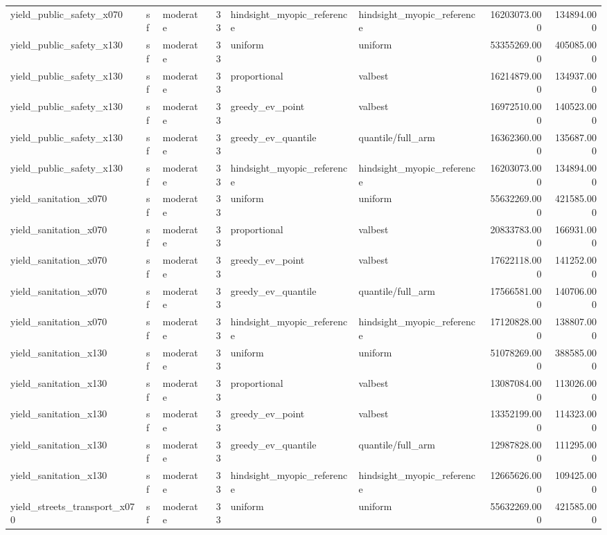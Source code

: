 \begin{tabular}{lllrllrr}
yield\_public\_safety\_x070 & sf & moderate & 33 & hindsight\_myopic\_reference & hindsight\_myopic\_reference & 16203073.000 & 134894.000 \\
yield\_public\_safety\_x130 & sf & moderate & 33 & uniform & uniform & 53355269.000 & 405085.000 \\
yield\_public\_safety\_x130 & sf & moderate & 33 & proportional & valbest & 16214879.000 & 134937.000 \\
yield\_public\_safety\_x130 & sf & moderate & 33 & greedy\_ev\_point & valbest & 16972510.000 & 140523.000 \\
yield\_public\_safety\_x130 & sf & moderate & 33 & greedy\_ev\_quantile & quantile/full\_arm & 16362360.000 & 135687.000 \\
yield\_public\_safety\_x130 & sf & moderate & 33 & hindsight\_myopic\_reference & hindsight\_myopic\_reference & 16203073.000 & 134894.000 \\
yield\_sanitation\_x070 & sf & moderate & 33 & uniform & uniform & 55632269.000 & 421585.000 \\
yield\_sanitation\_x070 & sf & moderate & 33 & proportional & valbest & 20833783.000 & 166931.000 \\
yield\_sanitation\_x070 & sf & moderate & 33 & greedy\_ev\_point & valbest & 17622118.000 & 141252.000 \\
yield\_sanitation\_x070 & sf & moderate & 33 & greedy\_ev\_quantile & quantile/full\_arm & 17566581.000 & 140706.000 \\
yield\_sanitation\_x070 & sf & moderate & 33 & hindsight\_myopic\_reference & hindsight\_myopic\_reference & 17120828.000 & 138807.000 \\
yield\_sanitation\_x130 & sf & moderate & 33 & uniform & uniform & 51078269.000 & 388585.000 \\
yield\_sanitation\_x130 & sf & moderate & 33 & proportional & valbest & 13087084.000 & 113026.000 \\
yield\_sanitation\_x130 & sf & moderate & 33 & greedy\_ev\_point & valbest & 13352199.000 & 114323.000 \\
yield\_sanitation\_x130 & sf & moderate & 33 & greedy\_ev\_quantile & quantile/full\_arm & 12987828.000 & 111295.000 \\
yield\_sanitation\_x130 & sf & moderate & 33 & hindsight\_myopic\_reference & hindsight\_myopic\_reference & 12665626.000 & 109425.000 \\
yield\_streets\_transport\_x070 & sf & moderate & 33 & uniform & uniform & 55632269.000 & 421585.000 \\

\end{tabular}
